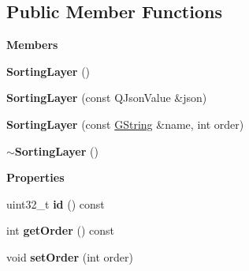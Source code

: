 \subsection*{Public Member Functions}
\begin{Indent}\textbf{ Members}\par
\begin{DoxyCompactItemize}
\item 
\mbox{\label{structrev_1_1_sorting_layer_acdc044db4938fb04d0bf94f47382281d}} 
{\bfseries Sorting\+Layer} ()
\item 
\mbox{\label{structrev_1_1_sorting_layer_a21e01b3b22708934963c6a5d6d68958e}} 
{\bfseries Sorting\+Layer} (const Q\+Json\+Value \&json)
\item 
\mbox{\label{structrev_1_1_sorting_layer_a6829eb9727b77e8a1a5b56771ee9a892}} 
{\bfseries Sorting\+Layer} (const \mbox{\hyperlink{classrev_1_1_g_string}{G\+String}} \&name, int order)
\item 
\mbox{\label{structrev_1_1_sorting_layer_a35fbe3a369f7a3016b58f2aefdc8bd0d}} 
{\bfseries $\sim$\+Sorting\+Layer} ()
\end{DoxyCompactItemize}
\end{Indent}
\begin{Indent}\textbf{ Properties}\par
\begin{DoxyCompactItemize}
\item 
\mbox{\label{structrev_1_1_sorting_layer_aedb1f5a753602ce266c790d5b8f4283b}} 
uint32\+\_\+t {\bfseries id} () const
\item 
\mbox{\label{structrev_1_1_sorting_layer_a7a9089aa9f2f14703f2fe0288d8f7d4a}} 
int {\bfseries get\+Order} () const
\item 
\mbox{\label{structrev_1_1_sorting_layer_a5403c9d2a27abb4bb6dca072961374b8}} 
void {\bfseries set\+Order} (int order)
\end{DoxyCompactItemize}
\end{Indent}
